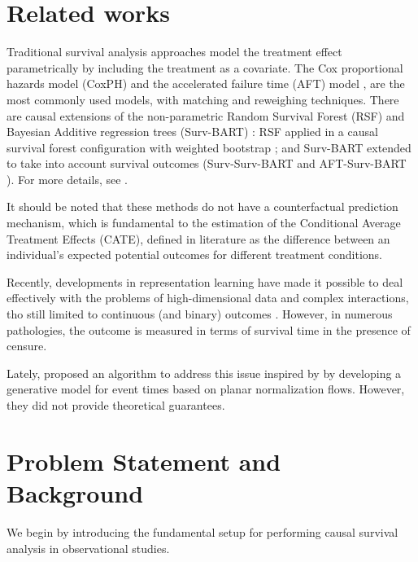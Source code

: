 \documentclass[12pt]{article}
\theoremstyle{plain}
\theoremstyle{definition}
\theoremstyle{remark}
\begin{document}


\section{Related works}
Traditional survival analysis approaches model the treatment effect parametrically by including the treatment as a covariate. The Cox proportional hazards model (CoxPH) \cite{Cox1972RegressionMA} and the accelerated failure time (AFT) model \cite{Wei1992TheAF}, are the most commonly used models, with matching and reweighing techniques. There are causal extensions of the non-parametric Random Survival Forest (RSF) \cite{Ishwaran2008RandomSF} and Bayesian Additive regression trees (Surv-BART) \cite{Sparapani2016NonparametricSA} : RSF applied in a causal survival forest configuration with weighted bootstrap \cite{Cui2020EstimatingHT}; and Surv-BART extended to take into account survival outcomes (Surv-Surv-BART \cite{Sparapani2016NonparametricSA} and AFT-Surv-BART \cite{Henderson2018IndividualizedTE}). For more details, see \cite{Hu2021EstimatingHS}.

It should be noted that these methods do not have a counterfactual prediction mechanism, which is fundamental to the estimation of the Conditional Average Treatment Effects (CATE), defined in literature as the difference between an individual's expected potential outcomes for different treatment conditions. 

Recently, developments in representation learning have made it possible to deal effectively with the problems of high-dimensional data and complex interactions, tho still limited to continuous (and binary) outcomes \cite{Johansson2020GeneralizationEffects}. However, in numerous pathologies, the outcome is measured in terms of survival time in the presence of censure.

Lately, \cite{chapfuwa2020survival} proposed an algorithm to address this issue inspired by \cite{Shalit2017EstimatingIT} by developing a generative model for event times based on planar normalization flows. However, they did not provide theoretical guarantees. 

\section{Problem Statement and Background}
\label{problem}
We begin by introducing the fundamental setup for performing causal survival analysis in observational studies.
\end{document}
